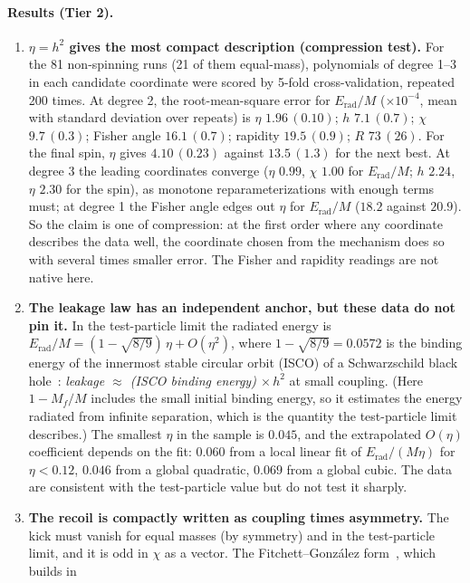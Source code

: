 \documentclass[11pt]{article}
\theoremstyle{definition}
\theoremstyle{remark}
\newcommand{\Erad}{E_{\mathrm{rad}}}
\begin{document}
\paragraph{Results (Tier 2).}
\begin{enumerate}\sloppy
\item \textbf{$\eta=h^2$ gives the most compact description (compression test).} For the 81
non-spinning runs (21 of them equal-mass), polynomials of degree 1--3 in each candidate
coordinate were scored by 5-fold cross-validation, repeated 200 times. At degree 2, the
root-mean-square error for $\Erad/M$ ($\times10^{-4}$, mean with standard deviation over
repeats) is $\eta$ $1.96\,(0.10)$; $h$ $7.1\,(0.7)$; $\chi$ $9.7\,(0.3)$; Fisher angle
$16.1\,(0.7)$; rapidity $19.5\,(0.9)$; $R$ $73\,(26)$. For the final spin, $\eta$ gives
$4.10\,(0.23)$ against $13.5\,(1.3)$ for the next best. At degree 3 the leading coordinates
converge ($\eta$ $0.99$, $\chi$ $1.00$ for $\Erad/M$; $h$ $2.24$, $\eta$ $2.30$ for the spin), as
monotone reparameterizations with enough terms must; at degree 1 the Fisher angle edges out
$\eta$ for $\Erad/M$ ($18.2$ against $20.9$). So the claim is one of compression: at the
first order where any coordinate describes the data well, the coordinate chosen from the
mechanism does so with several times smaller error. The Fisher and rapidity readings are not
native here.
\item \textbf{The leakage law has an independent anchor, but these data do not pin it.} In
the test-particle limit the radiated energy is $\Erad/M=(1-\sqrt{8/9})\,\eta+O(\eta^2)$, where
$1-\sqrt{8/9}=0.0572$ is the binding energy of the innermost stable circular orbit (ISCO) of a
Schwarzschild black hole~\cite{MTW1973,Barausse2012}: \emph{leakage $\approx$ (ISCO binding
energy) $\times\,h^2$} at small coupling. (Here $1-M_f/M$ includes the small initial binding
energy, so it estimates the energy radiated from infinite separation, which is the quantity
the test-particle limit describes.) The smallest $\eta$ in the sample is $0.045$, and the
extrapolated $O(\eta)$ coefficient depends on the fit: $0.060$ from a local linear fit of
$\Erad/(M\eta)$ for $\eta<0.12$, $0.046$ from a global quadratic, $0.069$ from a global cubic.
The data are consistent with the test-particle value but do not test it sharply.
\item \textbf{The recoil is compactly written as coupling times asymmetry.} The kick must
vanish for equal masses (by symmetry) and in the test-particle limit, and it is odd in $\chi$
as a vector. The Fitchett--Gonz\'alez form~\cite{Fitchett1983,Gonzalez2007}, which builds in

\end{enumerate}
\end{document}
